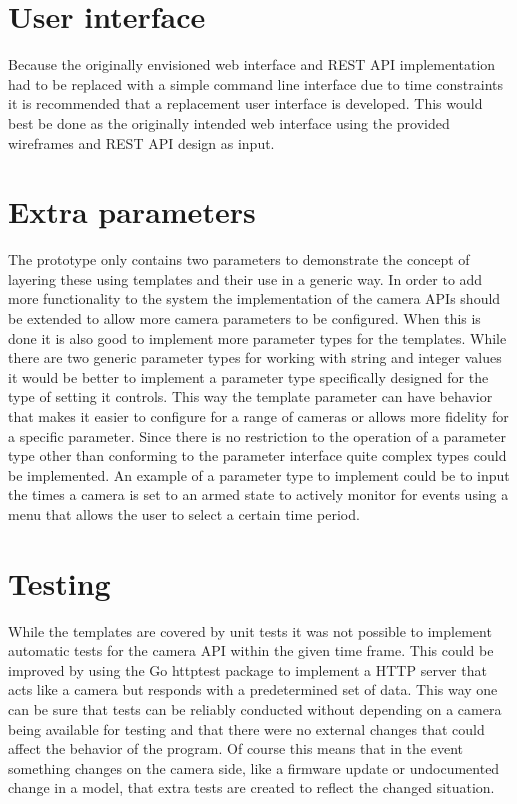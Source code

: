 \section{User interface}
Because the originally envisioned web interface and REST API implementation had to be replaced with a simple command line interface due to time constraints it is recommended that a replacement user interface is developed.
This would best be done as the originally intended web interface using the provided wireframes and REST API design as input.

\section{Extra parameters}
The prototype only contains two parameters to demonstrate the concept of layering these using templates and their use in a generic way.
In order to add more functionality to the system the implementation of the camera APIs should be extended to allow more camera parameters to be configured.
When this is done it is also good to implement more parameter types for the templates.
While there are two generic parameter types for working with string and integer values it would be better to implement a parameter type specifically designed for the type of setting it controls.
This way the template parameter can have behavior that makes it easier to configure for a range of cameras or allows more fidelity for a specific parameter.
Since there is no restriction to the operation of a parameter type other than conforming to the parameter interface quite complex types could be implemented.
An example of a parameter type to implement could be to input the times a camera is set to an armed state to actively monitor for events using a menu that allows the user to select a certain time period.

\section{Testing}
While the templates are covered by unit tests it was not possible to implement automatic tests for the camera API within the given time frame.
This could be improved by using the Go httptest package \cite{noauthor_golang_nodate} to implement a HTTP server that acts like a camera but responds with a predetermined set of data.
This way one can be sure that tests can be reliably conducted without depending on a camera being available for testing and that there were no external changes that could affect the behavior of the program.
Of course this means that in the event something changes on the camera side, like a firmware update or undocumented change in a model, that extra tests are created to reflect the changed situation.

